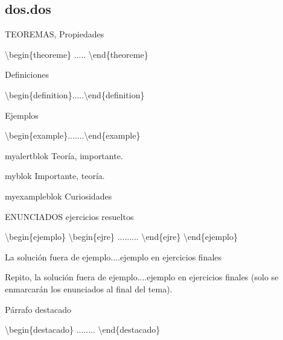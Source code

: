 \subsection{dos.dos}



\begin{theorem}
TEOREMAS, Propiedades

\textbackslash begin\{theoreme\} ..... \textbackslash end\{theoreme\}	
\end{theorem}

\begin{definition}
Definiciones

\textbackslash begin\{definition\}.....\textbackslash end\{definition\}	
\end{definition}

\begin{example}
Ejemplos

\textbackslash begin\{example\}.......\textbackslash end\{example\}	
\end{example}



\begin{myalertblock}{myalertblok}
	Teoría, importante.
\end{myalertblock}


\begin{myblock}{myblok}
	Importante, teoría.
\end{myblock}



\begin{myexampleblock}{myexampleblok}
	Curiosidades
\end{myexampleblock}




\begin{ejemplo}
\begin{ejre}
	ENUNCIADOS ejercicios resueltos
	
	\textbackslash begin\{ejemplo\} \textbackslash begin\{ejre\} .........   \textbackslash end\{ejre\} \textbackslash end\{ejemplo\}
\end{ejre}
La solución fuera de ejemplo....ejemplo en ejercicios finales
\end{ejemplo}
Repito, la solución fuera de ejemplo....ejemplo en ejercicios finales (solo se enmarcarán los enunciados al final del tema).

\begin{destacado}
Párrafo destacado

\textbackslash begin\{destacado\}	........ \textbackslash end\{destacado\}	
\end{destacado}



